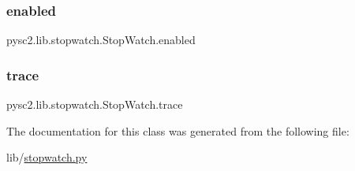 \subsubsection{\texorpdfstring{enabled}{enabled}}
{\footnotesize\ttfamily pysc2.\+lib.\+stopwatch.\+Stop\+Watch.\+enabled}

\mbox{\label{classpysc2_1_1lib_1_1stopwatch_1_1_stop_watch_a953ca11fe39ca3fb2d7a8c9b5cab0695}} 
\subsubsection{\texorpdfstring{trace}{trace}}
{\footnotesize\ttfamily pysc2.\+lib.\+stopwatch.\+Stop\+Watch.\+trace}



The documentation for this class was generated from the following file\+:\begin{DoxyCompactItemize}
\item 
lib/\mbox{\hyperlink{stopwatch_8py}{stopwatch.\+py}}\end{DoxyCompactItemize}
